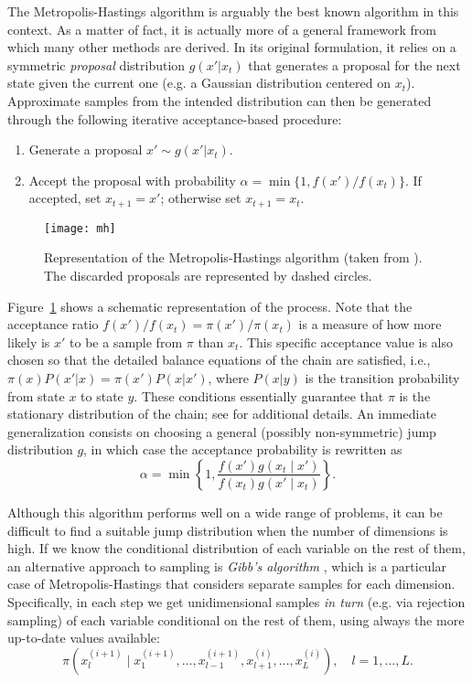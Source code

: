 The Metropolis-Hastings algorithm \citep{metropolis1953equation} is arguably the best known algorithm in this context. As a matter of fact, it is actually more of a general framework from which many other methods are derived. In its original formulation, it relies on a symmetric \textit{proposal} distribution \(g(x'|x_t)\) that generates a proposal for the next state given the current one (e.g. a Gaussian distribution centered on \(x_t\)). Approximate samples from the intended distribution can then be generated through the following iterative acceptance-based procedure:
\begin{enumerate}[1.]
  \item Generate a proposal \(x' \sim g(x'|x_t)\).
  \item Accept the proposal with probability \(\alpha=\min\{1, f(x')/f(x_t)\}\). If accepted, set \(x_{t+1}=x'\); otherwise set \(x_{t+1}=x_t\).
\end{enumerate}
 \begin{figure}[ht!]
   \centering
   \texttt{[image: mh]}
   \caption{Representation of the Metropolis-Hastings algorithm (taken from \citet{jaewook2015metamodel}). The discarded proposals are represented by dashed circles.}\label{fig:mh}
 \end{figure}
Figure~\ref{fig:mh} shows a schematic representation of the process. Note that the acceptance ratio \(f(x')/f(x_t)=\pi(x')/\pi(x_t)\) is a measure of how more likely is \(x'\) to be a sample from \(\pi\) than \(x_t\). This specific acceptance value is also chosen so that the detailed balance equations of the chain are satisfied, i.e., \(\pi(x)P(x'|x)=\pi(x')P(x|x')\), where \(P(x|y)\) is the transition probability from state \(x\) to state \(y\). These conditions essentially guarantee that \(\pi\) is the stationary distribution of the chain; see \citet{robert1999monte} for additional details. An immediate generalization consists on choosing a general (possibly non-symmetric) jump distribution \(g\), in which case the acceptance probability is rewritten as
\[
\alpha = \min\left\{1, \frac{f(x')g(x_t \mid x')}{f(x_t)g(x'\mid x_t)}\right\}.
\]

Although this algorithm performs well on a wide range of problems, it can be difficult to find a suitable jump distribution when the number of dimensions is high. If we know the conditional distribution of each variable on the rest of them, an alternative approach to sampling is \textit{Gibb's algorithm} \citep{geman1984stochastic}, which is a particular case of Metropolis-Hastings that considers separate samples for each dimension. Specifically, in each step we get unidimensional samples \textit{in turn} (e.g. via rejection sampling) of each variable conditional on the rest of them, using always the more up-to-date values available:
\[
\pi(x_l^{(i+1)} \mid x_{1}^{(i+1)}, \dots, x_{l-1}^{(i+1)}, x_{l+1}^{(i)}, \dots, x_L^{(i)}), \quad l=1,\dots,L.
\]

